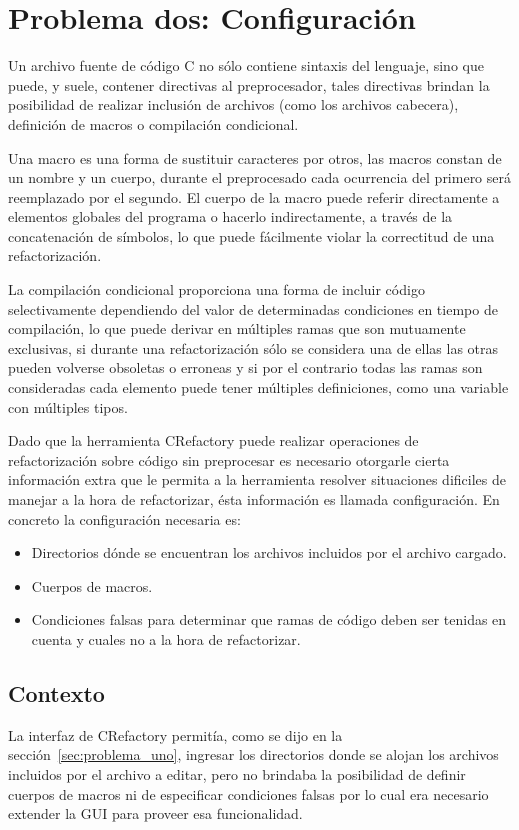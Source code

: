 \documentclass[a4paper,oneside,12pt]{article}
\begin{document}
\section{Problema dos: Configuraci\'on}
\label{sec:problema_dos}

Un archivo fuente de c\'odigo C no s\'olo contiene sintaxis del lenguaje, sino que puede, y suele, contener directivas al preprocesador, tales directivas brindan la posibilidad de realizar inclusi\'on de archivos (como los archivos cabecera), definici\'on de macros o compilaci\'on condicional.

Una macro es una forma de sustituir caracteres por otros, las macros constan de un nombre y un cuerpo, durante el preprocesado cada ocurrencia del primero ser\'a reemplazado por el segundo. El cuerpo de la macro puede referir directamente a elementos globales del programa o hacerlo indirectamente, a trav\'es de la concatenaci\'on de s\'imbolos, lo que puede f\'acilmente violar la correctitud de una refactorizaci\'on.

La compilaci\'on condicional proporciona una forma de incluir c\'odigo selectivamente dependiendo del valor de determinadas condiciones en tiempo de compilaci\'on, lo que puede derivar en m\'ultiples ramas que son mutuamente exclusivas, si durante una refactorizaci\'on s\'olo se considera una de ellas las otras pueden volverse obsoletas o erroneas y si por el contrario todas las ramas son consideradas cada elemento puede tener m\'ultiples definiciones, como una variable con m\'ultiples tipos.

Dado que la herramienta CRefactory puede realizar operaciones de refactorizaci\'on sobre c\'odigo sin preprocesar es necesario otorgarle cierta informaci\'on extra que le permita a la herramienta resolver situaciones dificiles de manejar a la hora de refactorizar, \'esta informaci\'on es llamada configuraci\'on. En concreto la configuraci\'on necesaria es:

\begin{itemize}
\item Directorios d\'onde se encuentran los archivos incluidos por el archivo cargado.
\item Cuerpos de macros.
\item Condiciones falsas para determinar que ramas de c\'odigo deben ser tenidas en cuenta y cuales no a la hora de refactorizar.
\end{itemize}

\subsection{Contexto}
La interfaz de CRefactory permit\'ia, como se dijo en la secci\'on~\ref{sec:problema_uno}, ingresar los directorios donde se alojan los archivos incluidos por el archivo a editar, pero no brindaba la posibilidad de definir cuerpos de macros ni de especificar condiciones falsas por lo cual era necesario extender la GUI para proveer esa funcionalidad.
\end{document}
